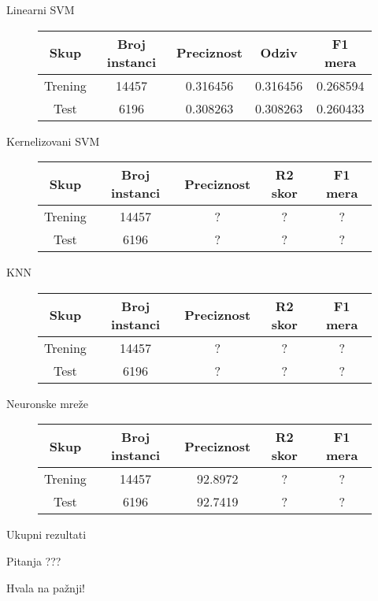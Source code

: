 \documentclass{beamer}
\begin{document}
\begin{frame}[fragile]{Linearni SVM}
    \begin{figure}[!h]
    \centering
    \begin{tabular}{ | c | c | c | c | c |}
        \hline
        Skup & Broj instanci & Preciznost & Odziv & F1 mera \\
        \hline
        Trening & 14457 & 0.316456 & 0.316456 & 0.268594 \\
        Test & 6196 & 0.308263 & 0.308263 & 0.260433 \\
        \hline
    \end{tabular}
    \end{figure}
\end{frame}

\begin{frame}[fragile]{Kernelizovani SVM}
    \begin{figure}[!h]
    \centering
    \begin{tabular}{ | c | c | c | c | c |}
        \hline
        Skup & Broj instanci & Preciznost & R2 skor & F1 mera \\
        \hline
        Trening & 14457 & ? & ? & ? \\
        Test & 6196 & ? & ? & ? \\
        \hline
    \end{tabular}
    \end{figure}
\end{frame}

\begin{frame}[fragile]{KNN}
    \begin{figure}[!h]
    \centering
    \begin{tabular}{ | c | c | c | c | c |}
        \hline
        Skup & Broj instanci & Preciznost & R2 skor & F1 mera \\
        \hline
        Trening & 14457 & ? & ? & ? \\
        Test & 6196 & ? & ? & ? \\
        \hline
    \end{tabular}
    \end{figure}
\end{frame}

\begin{frame}[fragile]{Neuronske mre\v{z}e}
    \begin{figure}[!h]
    \centering
    \begin{tabular}{ | c | c | c | c | c|}
        \hline
        Skup & Broj instanci & Preciznost & R2 skor & F1 mera \\
        \hline
        Trening & 14457 & 92.8972 & ? & ? \\
        Test & 6196 & 92.7419 & ? & ? \\
        \hline
    \end{tabular}
    \end{figure}
\end{frame}

\begin{frame}[fragile]{Ukupni rezultati}
\end{frame}

\begin{frame}{Pitanja}
    \centering
    ???
\end{frame}

\begin{frame}{}
    \centering
    Hvala na pa\v{z}nji!
\end{frame}
\end{document}
